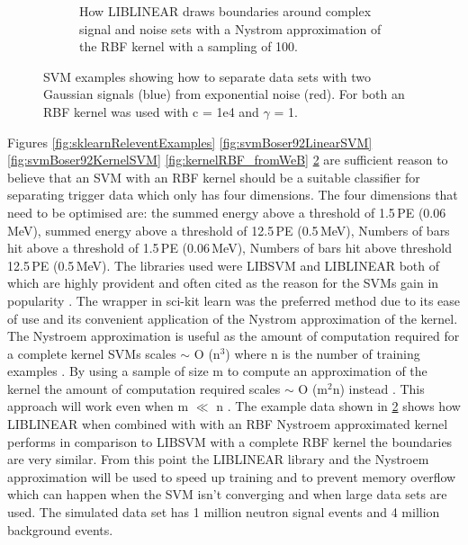 \begin{figure}[htbp]
\begin{subfigure}{.5\textwidth}
  \captionsetup{width=.9\linewidth}
  \caption{How LIBLINEAR draws boundaries around complex signal and noise sets with a Nystrom approximation of the RBF kernel with a sampling of 100.}
  \label{subFig:exp_2NysGaussExample}
\end{subfigure}
\caption{SVM examples showing how to separate data sets with two Gaussian signals (blue) from exponential noise (red). For both an RBF kernel was used with c = 1e4 and $\gamma$ = 1.}
\label{fig:svmExp_GausseExamples}
\end{figure}

Figures \ref{fig:sklearnReleventExamples} \ref{fig:svmBoser92LinearSVM} \ref{fig:svmBoser92KernelSVM} \ref{fig:kernelRBF_fromWeB} \ref{fig:svmExp_GausseExamples} are sufficient reason to believe that an SVM with an RBF kernel should be a suitable classifier for separating trigger data which only has four dimensions. The four dimensions that need to be optimised are: the summed energy above a threshold of 1.5\,PE (0.06\,MeV), summed energy above a threshold of 12.5\,PE (0.5\,MeV), Numbers of bars hit above a threshold of 1.5\,PE (0.06\,MeV), Numbers of bars hit above threshold 12.5\,PE (0.5\,MeV). The libraries used were LIBSVM and LIBLINEAR both of which are highly provident and often cited as the reason for the SVMs gain in popularity \cite{chang2011libsvm} \cite{fan2008liblinear} \cite{murty2016support}. The wrapper in sci-kit learn was the preferred method due to its ease of use and its convenient application of the Nystrom approximation \cite{williams2001using} of the kernel. The Nystroem approximation is useful as the amount of computation required for a complete kernel SVMs scales $\sim$ O (n$^3$) where n is the number of training examples \cite{williams2001using}. By using a sample of size m to compute an approximation of the kernel the amount of computation required scales $\sim$ O (m$^2$n) instead \cite{williams2001using}. This approach will work even when m $\ll$ n \cite{williams2001using}. The example data shown in \ref{fig:svmExp_GausseExamples} shows how LIBLINEAR when combined with with an RBF Nystroem approximated kernel performs in comparison to LIBSVM with a complete RBF kernel the boundaries are very similar. From this point the LIBLINEAR library and the Nystroem approximation will be used to speed up training and to prevent memory overflow which can happen when the SVM isn't converging and when large data sets are used. The simulated data set has 1 million neutron signal events and 4 million background events.
